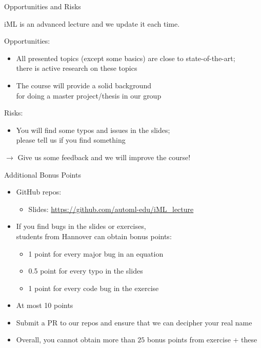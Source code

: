 \documentclass[aspectratio=169]{../latex_main/tntbeamer}  %
\begin{document}
\begin{frame}[c]{Opportunities and Risks}

iML is an advanced lecture and we update it each time.

\bigskip
\pause

Opportunities:
\begin{itemize}
  \item All presented topics (except some basics) are close to state-of-the-art;\\there is active research on these topics  
  \item The course will provide a solid background\\ for doing a master project/thesis in our group 
\end{itemize}

\medskip

Risks:
\begin{itemize}
  \item You will find some typos and issues in the slides;\\ please tell us if you find something
\end{itemize}

\medskip
$\to$ Give us some feedback and we will improve the course!


\end{frame}
\begin{frame}[c]{Additional Bonus Points}

\begin{itemize}
    \item GitHub repos:
    \begin{itemize}
        \item Slides: \url{https://github.com/automl-edu/iML_lecture}
    \end{itemize}
    \item If you find bugs in the slides or exercises,\\ students from Hannover can obtain bonus points:
    \begin{itemize}
        \item 1 point for every major bug in an equation
        \item 0.5 point for every typo in the slides
        \item 1 point for every code bug in the exercise
    \end{itemize}
    \item At most 10 points 
    \item Submit a PR to our repos and ensure that we can decipher your real name
    \medskip
    \item Overall, you cannot obtain more than $25$ bonus points from exercise + these
\end{itemize}


\end{frame}
\end{document}
